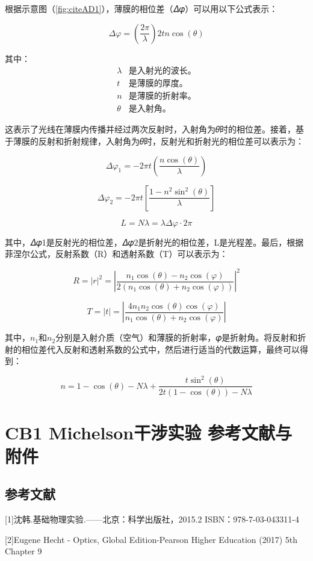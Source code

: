 \documentclass[dvipsnames, svgnames,a4paper,11pt]{article}
\begin{document}
	根据示意图（\cref{fig:citeAD1}），薄膜的相位差（𝛥𝜑）可以用以下公式表示：
	
	\[ \Delta\varphi = \left(\frac{2\pi}{\lambda}\right) 2t n \cos(\theta) \]
	
	其中：
	\begin{align*}
		\lambda & \text{是入射光的波长。} \\
		t & \text{是薄膜的厚度。} \\
		n & \text{是薄膜的折射率。} \\
		\theta & \text{是入射角。}
	\end{align*}
	
	这表示了光线在薄膜内传播并经过两次反射时，入射角为𝜃时的相位差。接着，基于薄膜的反射和折射规律，入射角为𝜃时，反射光和折射光的相位差可以表示为：
	
	\[ \Delta\varphi_1 = -2\pi t \left(\frac{n \cos(\theta)}{\lambda}\right) \]
	
	\[ \Delta\varphi_2 = -2\pi t \left[\frac{1 - n^2 \sin^2(\theta)}{\lambda}\right] \]
	
	\[ L = N\lambda = \lambda\Delta\varphi \cdot 2\pi \]
	
	其中，𝛥𝜑1是反射光的相位差，𝛥𝜑2是折射光的相位差，L是光程差。最后，根据菲涅尔公式，反射系数（R）和透射系数（T）可以表示为：
	
	\[ R = \left|r\right|^2 = \left|\frac{n_1 \cos(\theta) - n_2 \cos(\varphi)}{2 (n_1 \cos(\theta) + n_2 \cos(\varphi))}\right|^2 \]
	
	\[ T = \left|t\right| = \left|\frac{4n_1n_2 \cos(\theta)\cos(\varphi)}{n_1 \cos(\theta) + n_2 \cos(\varphi)}\right| \]
	
	其中，\(n_1\)和\(n_2\)分别是入射介质（空气）和薄膜的折射率，𝜑是折射角。将反射和折射的相位差代入反射和透射系数的公式中，然后进行适当的代数运算，最终可以得到：
	
	\[ n = 1 - \cos(\theta) - N\lambda + \frac{t\sin^2(\theta)}{2t(1 - \cos(\theta)) - N\lambda} \]
	
	
	
	\clearpage
	\section{CB1 Michelson干涉实验 \quad\heiti 参考文献与附件}
	\subsection{参考文献}
	[1]沈韩.基础物理实验.——北京：科学出版社，2015.2 ISBN：978-7-03-043311-4 
	
	[2]Eugene Hecht - Optics, Global Edition-Pearson Higher Education (2017) 5th Chapter 9 
	
\end{document}

